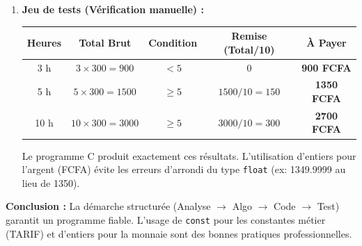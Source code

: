 \documentclass[11pt]{article}
\begin{document}
\begin{exoresolu}
\begin{enumerate}
\begin{lstlisting}[language=C]
int main(void) {
    int nbHeures;
    const int TARIF = 300; // Constante pour le tarif
    int total, remise, aPayer; // Tout en entiers (FCFA) pour éviter erreurs float

    printf("=== Cyber @BiyemAssi ===\n");
    printf("Tarif : %d FCFA/h. Remise 10%% si >= 5h.\n", TARIF);

    // Saisie sécurisée (boucle tant que invalide)
    do {
        printf("Nombre d'heures desirees (entier > 0) : ");
        if (scanf("%d", &nbHeures) != 1) { // Gestion saisie non-numerique
            printf("Erreur : saisir un nombre entier.\n");
            while(getchar() != '\n'); // Vider le buffer clavier
            nbHeures = 0; // Forcer reprise boucle
        }
    } while (nbHeures <= 0);

    total = nbHeures * TARIF;

    // Calcul remise en entier : (total * 10) / 100 = total / 10
    // Division entière = arrondi au plus bas automatique en C pour positifs
    if (nbHeures >= 5) {
        remise = total / 10; 
    } else {
        remise = 0;
    }

    aPayer = total - remise;

    printf("------------------------\n");
    printf("Total brut   : %d FCFA\n", total);
    printf("Remise (10%%) : %d FCFA\n", remise);
    printf("A PAYER     : %d FCFA\n", aPayer);

    return 0;
}
        \end{lstlisting}
        \item \textbf{Jeu de tests (Vérification manuelle) :}
        \begin{center}
        \begin{tabular}{|c|c|c|c|c|}
        \hline
        \rowcolor{popblueL}
        \textbf{Heures} & \textbf{Total Brut} & \textbf{Condition} & \textbf{Remise (Total/10)} & \textbf{À Payer} \\ \hline
        3 h & $3 \times 300 = 900$ & $< 5$ & 0 & \textbf{900 FCFA} \\ \hline
        5 h & $5 \times 300 = 1500$ & $\ge 5$ & $1500 / 10 = 150$ & \textbf{1350 FCFA} \\ \hline
        10 h & $10 \times 300 = 3000$ & $\ge 5$ & $3000 / 10 = 300$ & \textbf{2700 FCFA} \\ \hline
        \end{tabular}
        \end{center}
        Le programme C produit exactement ces résultats. L'utilisation d'entiers pour l'argent (FCFA) évite les erreurs d'arrondi du type \texttt{float} (ex: 1349.9999 au lieu de 1350).
    \end{enumerate}
    \textbf{Conclusion :} La démarche structurée (Analyse $\to$ Algo $\to$ Code $\to$ Test) garantit un programme fiable. L'usage de \texttt{const} pour les constantes métier (TARIF) et d'entiers pour la monnaie sont des bonnes pratiques professionnelles.
\end{exoresolu}
\end{document}
